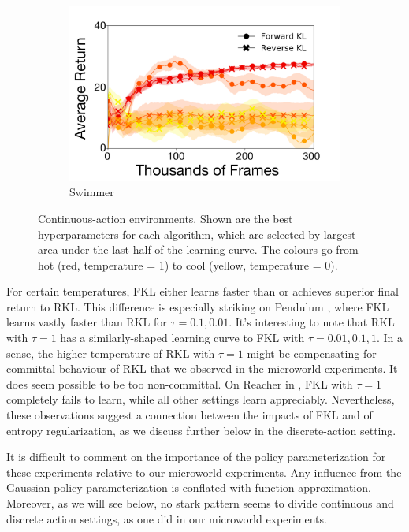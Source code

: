 \documentclass[\main/thesis.tex]{subfiles}
\begin{document}
\begin{figure}[t]
  \begin{subfigure}[b]{0.5\linewidth}
    \centering
    \includegraphics[width=\columnwidth]{figs/deep/continuous/Swimmer_entropy_comparison.pdf} 
    \caption{Swimmer}\label{fig:swimmer}
  \end{subfigure}
  \caption{Continuous-action environments. Shown are the best hyperparameters for each algorithm, which are selected by largest area under the last half of the learning curve. The colours go from hot (red, temperature = 1) to cool (yellow, temperature = 0). }\label{fig_cont}
\end{figure}

For certain temperatures, FKL either learns faster than or achieves superior final return to RKL. This difference is especially striking on Pendulum , where FKL learns vastly faster than RKL for $\tau = 0.1, 0.01$. It's interesting to note that RKL with $\tau = 1$ has a similarly-shaped learning curve to FKL with $\tau = 0.01, 0.1, 1$. In a sense, the higher temperature of RKL with $\tau = 1$ might be compensating for committal behaviour of RKL that we observed in the microworld experiments. It does seem possible to be too non-committal. On Reacher in , FKL with $\tau = 1$ completely fails to learn, while all other settings learn appreciably. Nevertheless, these observations suggest a connection between the impacts of FKL and of entropy regularization, as we discuss further below in the discrete-action setting. 

It is difficult to comment on the importance of the policy parameterization for these experiments relative to our microworld experiments. Any influence from the Gaussian policy parameterization is conflated with function approximation. Moreover, as we will see below, no stark pattern seems to divide continuous and discrete action settings, as one did in our microworld experiments. 
\end{document}
